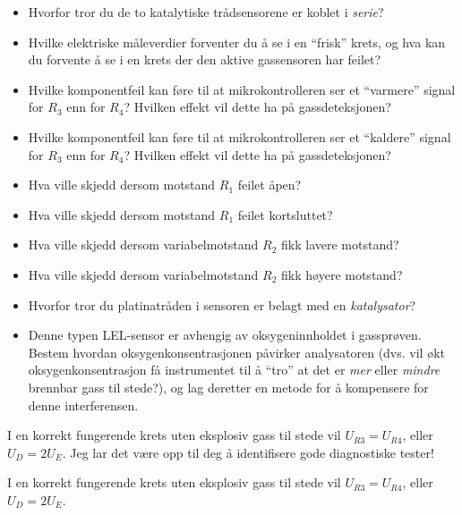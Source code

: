 \begin{itemize}
\item{} Hvorfor tror du de to katalytiske trådsensorene er koblet i {\it serie}?
\item{} Hvilke elektriske måleverdier forventer du å se i en ``frisk'' krets, og hva kan du forvente å se i en krets der den aktive gassensoren har feilet?
\item{} Hvilke komponentfeil kan føre til at mikrokontrolleren ser et ``varmere'' signal for $R_3$ enn for $R_4$? Hvilken effekt vil dette ha på gassdeteksjonen?
\item{} Hvilke komponentfeil kan føre til at mikrokontrolleren ser et ``kaldere'' signal for $R_3$ enn for $R_4$? Hvilken effekt vil dette ha på gassdeteksjonen?
\item{} Hva ville skjedd dersom motstand $R_1$ feilet åpen?
\item{} Hva ville skjedd dersom motstand $R_1$ feilet kortsluttet?
\item{} Hva ville skjedd dersom variabelmotstand $R_2$ fikk lavere motstand?
\item{} Hva ville skjedd dersom variabelmotstand $R_2$ fikk høyere motstand?
\item{} Hvorfor tror du platinatråden i sensoren er belagt med en {\it katalysator}?
\item{} Denne typen LEL-sensor er avhengig av oksygeninnholdet i gassprøven. Bestem hvordan oksygenkonsentrasjonen påvirker analysatoren (dvs. vil økt oksygenkonsentrasjon få instrumentet til å ``tro'' at det er {\it mer} eller {\it mindre} brennbar gass til stede?), og lag deretter en metode for å kompensere for denne interferensen.
\end{itemize}







I en korrekt fungerende krets uten eksplosiv gass til stede vil $U_{R3} = U_{R4}$, eller $U_D = 2 U_E$. Jeg lar det være opp til deg å identifisere gode diagnostiske tester!







I en korrekt fungerende krets uten eksplosiv gass til stede vil $U_{R3} = U_{R4}$, eller $U_D = 2 U_E$.

\vskip 10pt

